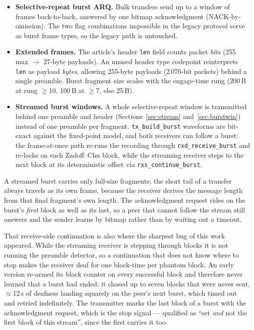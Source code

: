 \begin{itemize}
    \item \textbf{Selective-repeat burst ARQ.}  Bulk transfers send up
          to a window of frames back-to-back, answered by one bitmap
          acknowledgment (NACK-by-omission).  The two flag combinations
          impossible in the legacy protocol serve as burst frame types,
          so the legacy path is untouched.
    \item \textbf{Extended frames.}  The article's header \texttt{len}
          field counts packet \emph{bits} (255 max
          $\rightarrow$ 27-byte payloads).  An unused header type
          codepoint reinterprets \texttt{len} as payload \emph{bytes},
          allowing 255-byte payloads (2\,076-bit packets) behind a
          single preamble.  Burst fragment size scales with the
          engage-time rung (200\,B at rung $\ge$10, 100\,B at $\ge$7,
          else 25\,B).
    \item \textbf{Streamed burst windows.}  A whole selective-repeat
          window is transmitted behind one preamble and header
          (Sections~\ref{sec:stream} and~\ref{sec:burstwin}) instead
          of one preamble per fragment.  \texttt{tx\_build\_burst}
          waveforms are bit-exact against the fixed-point model, and
          both receivers can follow a burst: the frame-at-once path
          re-runs the recording through \texttt{rxd\_receive\_burst}
          and re-locks on each Zadoff--Chu block, while the streaming
          receiver steps to the next block at its deterministic offset
          via \texttt{rxs\_continue\_burst}.
\end{itemize}

A streamed burst carries only full-size fragments; the short tail of a
transfer always travels as its own frame, because the receiver derives
the message length from that final fragment's own length.  The
acknowledgment request rides on the burst's \emph{first} block as well
as its last, so a peer that cannot follow the stream still answers and
the sender learns by bitmap rather than by waiting out a timeout.

That receive-side continuation is also where the sharpest bug of this
work appeared.  While the streaming receiver is stepping through
blocks it is not running the preamble detector, so a continuation that
does not know where to stop makes the receiver deaf for one block-time
per phantom block.  An early version re-armed its block counter on
every successful block and therefore never learned that a burst had
ended: it chased up to seven blocks that were never sent,
$\approx$12\,s of deafness landing squarely on the peer's next burst,
which timed out and retried indefinitely.  The transmitter marks the
last block of a burst with the acknowledgment request, which is the
stop signal --- qualified as ``set \emph{and} not the first block of
this stream'', since the first carries it too.

